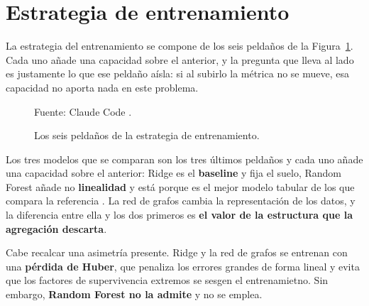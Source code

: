 
\section{Estrategia de entrenamiento}
\label{sec:entrenamiento}

La estrategia del entrenamiento se compone de los seis peldaños de la
Figura~\ref{fig:peldanos}. Cada uno añade una capacidad sobre el anterior, y la pregunta que
lleva al lado es justamente lo que ese peldaño aísla: si al subirlo la métrica no se mueve,
esa capacidad no aporta nada en este problema.

\begin{figure}[htbp]
    \centering
    \caption{Los seis peldaños de la estrategia de entrenamiento.}
    \label{fig:peldanos}

    

    {\footnotesize Fuente: Claude Code \cite{anthropic_claude}.}
\end{figure}

Los tres modelos que se comparan son los tres últimos peldaños y cada uno añade una capacidad sobre el anterior: Ridge es el
\textbf{baseline} y fija el suelo, Random Forest añade no \textbf{linealidad} y está porque es el mejor modelo tabular de los que compara la referencia \cite{liao2024machine}. La red de grafos cambia la representación de los datos, y la diferencia entre ella y los dos primeros es \textbf{el valor de la
estructura que la agregación descarta}.

Cabe recalcar una asimetría presente. Ridge y la red de
grafos se entrenan con una \textbf{pérdida de Huber}, que penaliza los errores grandes de forma lineal y evita que los factores de supervivencia extremos se sesgen el entrenamietno. Sin embargo, \textbf{Random Forest no la admite} y no se emplea.


